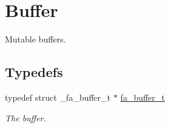 \hypertarget{group___fa_buffer}{\section{Buffer}
\label{group___fa_buffer}
}


Mutable buffers.  


\subsection*{Typedefs}
\begin{DoxyCompactItemize}
\item 
typedef struct \-\_\-fa\-\_\-buffer\-\_\-t $\ast$ \hyperlink{group___fa_buffer_ga0ed7a1d783ab322e2e8be02432d0839e}{fa\-\_\-buffer\-\_\-t}
\begin{DoxyCompactList}\small\item\em The buffer. \end{DoxyCompactList}\end{DoxyCompactItemize}

